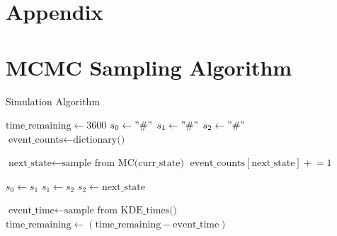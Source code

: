 \documentclass[11pt]{article}
\begin{document}
\newpage


\section*{Appendix}

\appendix
\section{MCMC Sampling Algorithm}
\label{mcmc_app}

\begin{algorithm}
    \caption{Simulation Algorithm}
    \begin{algorithmic}[1]
        \State $\text{time\_remaining} \gets 3600$
        \State $s_0 \gets "\#"$
        \State $s_1 \gets "\#"$
        \State $s_2 \gets "\#"$
        \State $\text{event\_counts} \gets \text{dictionary()}$

            \State $\text{next\_state} \gets \text{sample from } \text{MC(curr\_state)}$
            \State $\text{event\_counts}[\text{next\_state}] \mathrel{+}= 1$
            
            \State $s_0 \gets s_1$
            \State $s_1 \gets s_2$
            \State $s_2 \gets \text{next\_state}$

            \State $\text{event\_time} \gets \text{sample from } \text{KDE\_times()}$
            \State $\text{time\_remaining} \gets (\text{time\_remaining} - \text{event\_time})$
        \EndWhile
    \end{algorithmic}
    \label{alg:monte_carlo_algorithm}
\end{algorithm}
\end{document}
